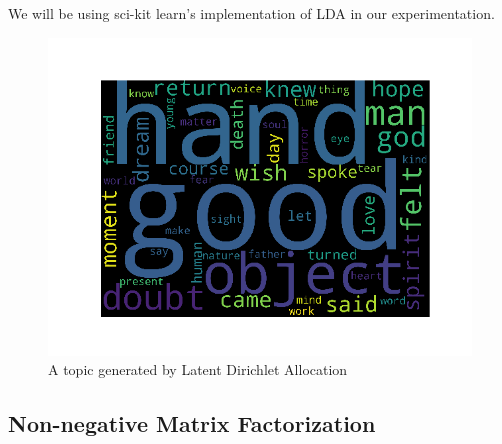 \documentclass{article}
\begin{document}
We will be using sci-kit learn's implementation of LDA in our experimentation. 
\begin{figure}[!ht]
    \centering
    \includegraphics[scale =.5]{lda_topic.png}
    \caption{A topic generated by Latent Dirichlet Allocation}
    \label{fig:lda_topic}
\end{figure}

\subsection{Non-negative Matrix Factorization}
\end{document}
